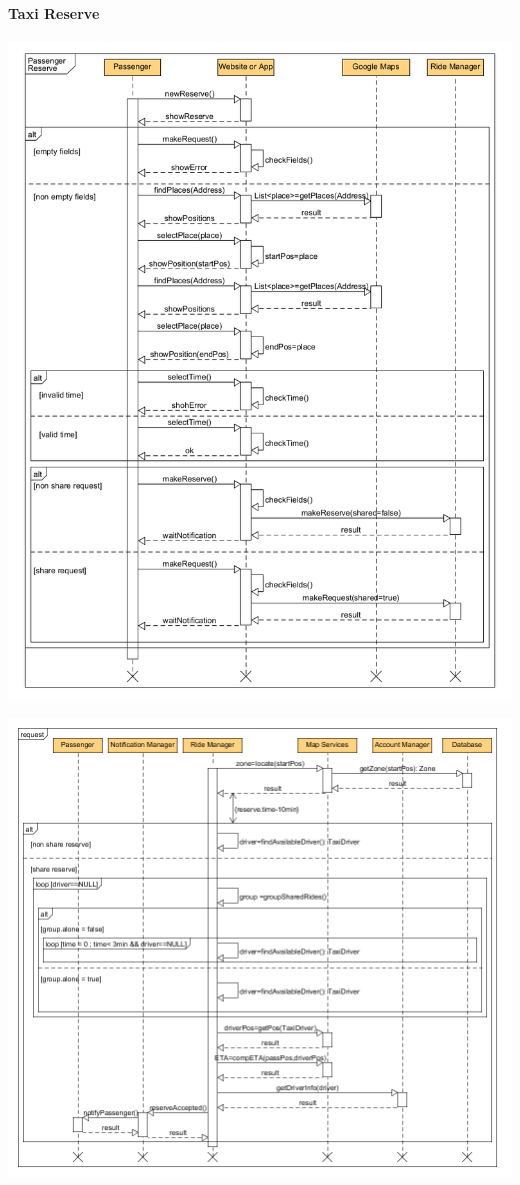 \paragraph{Taxi Reserve}
	\begin{center}
		\includegraphics[width=\textwidth]{diagrams/passengerReserve.png}
	\end{center}
	
	\begin{center}
		\includegraphics[width=\textwidth]{diagrams/serverReserve.png}
	\end{center}